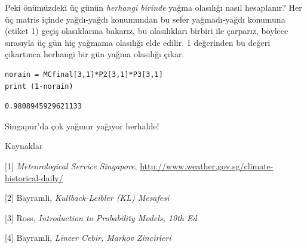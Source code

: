 \documentclass[12pt,fleqn]{article}\usepackage{../../common}
\begin{document}
Peki önümüzdeki üç günün {\em herhangi birinde} yağma olasılığı nasıl
hesaplanır?  Her üç matris içinde yağdı-yağdı konumundan bu sefer yağmadı-yağdı
konumuna (etiket 1) geçiş olasıklarına bakarız, bu olasılıkları birbiri ile
çarparız, böylece sırasıyla üç gün hiç yağmama olasılığı elde edilir. 1
değerinden bu değeri çıkartınca herhangi bir gün yağma olasılığı çıkar.

\begin{verbatim}
norain = MCfinal[3,1]*P2[3,1]*P3[3,1]
print (1-norain)
\end{verbatim}

\begin{verbatim}
0.9808945929621133
\end{verbatim}

Singapur'da çok yağmur yağıyor herhalde!

Kaynaklar

[1] {\em Meteorological Service Singapore},
    \url{http://www.weather.gov.sg/climate-historical-daily/}

[2] Bayramli, {\em Kullback-Leibler (KL) Mesafesi}

[3] Ross, {\em Introduction to Probability Models, 10th Ed}

[4] Bayramli, {\em Lineer Cebir, Markov Zincirleri}
\end{document}
